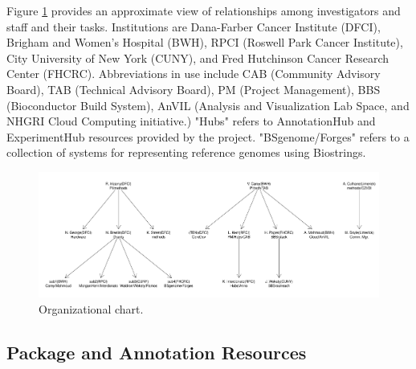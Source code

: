 \documentclass[letterpaper]{article}
\begin{document}
Figure \ref{fig:org-chart} provides an approximate view of
relationships among investigators and staff and their tasks.
Institutions are Dana-Farber Cancer Institute (DFCI),
Brigham and Women's Hospital (BWH), RPCI (Roswell Park
Cancer Institute), City University of New York (CUNY), and
Fred Hutchinson Cancer Research Center (FHCRC).  Abbreviations
in use include CAB (Community Advisory Board), TAB (Technical
Advisory Board), PM (Project Management), BBS (Bioconductor 
Build System), AnVIL (Analysis and Visualization Lab Space, and
NHGRI Cloud Computing initiative.)  "Hubs" refers to AnnotationHub
and ExperimentHub resources provided by the project.  "BSgenome/Forges"
refers to a collection of systems for representing reference genomes
using Biostrings.


\begin{figure}[h]
  \begin{center}
    \includegraphics[width=1.1\textwidth,height=!]{newgr2}
    \caption{Organizational chart.}
    \label{fig:org-chart}
  \end{center}
\end{figure}



\subsection{Package and Annotation Resources}
\end{document}
